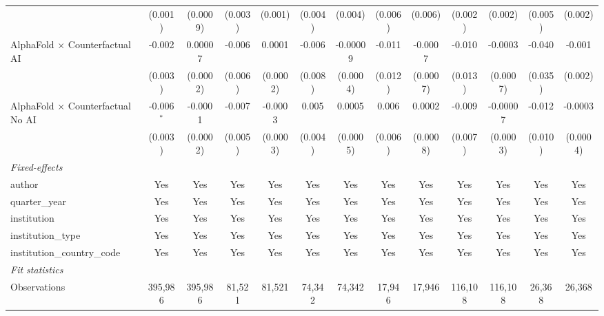 \begin{tabular}{lcccccccccccc}
                                            & (0.001)       & (0.0009)      & (0.003) & (0.001)       & (0.004) & (0.004)  & (0.006) & (0.006)     & (0.002) & (0.002)       & (0.005) & (0.002)\\   
   AlphaFold $\times$ Counterfactual AI     & -0.002        & 0.00007       & -0.006  & 0.0001        & -0.006  & -0.00009 & -0.011  & -0.0007     & -0.010  & -0.0003       & -0.040  & -0.001\\   
                                            & (0.003)       & (0.0002)      & (0.006) & (0.0002)      & (0.008) & (0.0004) & (0.012) & (0.0007)    & (0.013) & (0.0007)      & (0.035) & (0.002)\\   
   AlphaFold $\times$ Counterfactual No AI  & -0.006$^{*}$  & -0.0001       & -0.007  & -0.0003       & 0.005   & 0.0005   & 0.006   & 0.0002      & -0.009  & -0.00007      & -0.012  & -0.0003\\   
                                            & (0.003)       & (0.0002)      & (0.005) & (0.0003)      & (0.004) & (0.0005) & (0.006) & (0.0008)    & (0.007) & (0.0003)      & (0.010) & (0.0004)\\   
   \midrule
   \emph{Fixed-effects}\\
   author                                   & Yes           & Yes           & Yes     & Yes           & Yes     & Yes      & Yes     & Yes         & Yes     & Yes           & Yes     & Yes\\  
   quarter\_year                            & Yes           & Yes           & Yes     & Yes           & Yes     & Yes      & Yes     & Yes         & Yes     & Yes           & Yes     & Yes\\  
   institution                              & Yes           & Yes           & Yes     & Yes           & Yes     & Yes      & Yes     & Yes         & Yes     & Yes           & Yes     & Yes\\  
   institution\_type                        & Yes           & Yes           & Yes     & Yes           & Yes     & Yes      & Yes     & Yes         & Yes     & Yes           & Yes     & Yes\\  
   institution\_country\_code               & Yes           & Yes           & Yes     & Yes           & Yes     & Yes      & Yes     & Yes         & Yes     & Yes           & Yes     & Yes\\  
   \midrule
   \emph{Fit statistics}\\
   Observations                             & 395,986       & 395,986       & 81,521  & 81,521        & 74,342  & 74,342   & 17,946  & 17,946      & 116,108 & 116,108       & 26,368  & 26,368\\  

\end{tabular}
